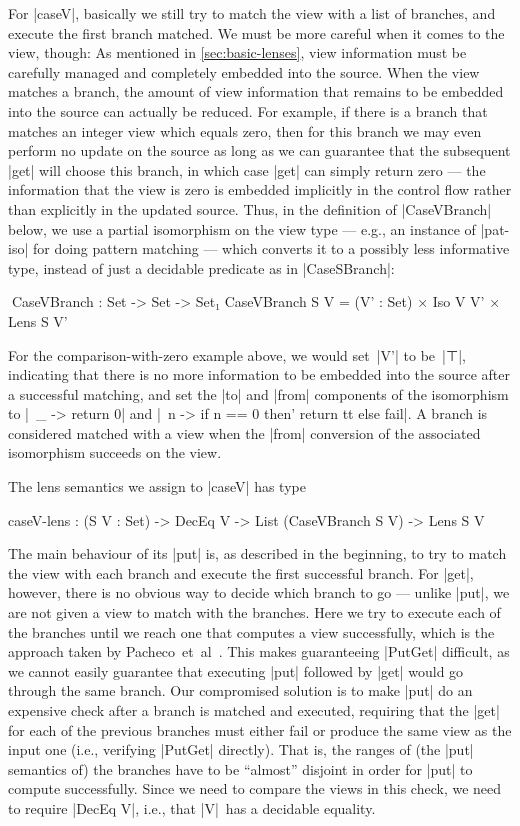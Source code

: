 \documentclass[fleqn]{llncs}
\begin{document}
For |caseV|, basically we still try to match the view with a list of branches, and execute the first branch matched.
We must be more careful when it comes to the view, though:
As mentioned in \autoref{sec:basic-lenses}, view information must be carefully managed and completely embedded into the source.
When the view matches a branch, the amount of view information that remains to be embedded into the source can actually be reduced.
For example, if there is a branch that matches an integer view which equals zero, then for this branch we may even perform no update on the source as long as we can guarantee that the subsequent |get| will choose this branch, in which case |get| can simply return zero --- the information that the view is zero is embedded implicitly in the control flow rather than explicitly in the updated source.
Thus, in the definition of |CaseVBranch| below, we use a partial isomorphism on the view type --- e.g., an instance of |pat-iso| for doing pattern matching --- which converts it to a possibly less informative type, instead of just a decidable predicate as in |CaseSBranch|:
\begin{code}
^^^CaseVBranch : Set -> Set -> Set₁
CaseVBranch S V = (V' : Set) × Iso V V' × Lens S V'
\end{code}
For the comparison-with-zero example above, we would set~|V'| to be~|⊤|, indicating that there is no more information to be embedded into the source after a successful matching, and set the |to| and |from| components of the isomorphism to |\ _ -> return 0| and |\ n -> if n == 0 then' return tt else fail|.
A branch is considered matched with a view when the |from| conversion of the associated isomorphism succeeds on the view.

The lens semantics we assign to |caseV| has type
\begin{code}
caseV-lens : (S V : Set) -> DecEq V -> List (CaseVBranch S V) -> Lens S V
\end{code}
The main behaviour of its |put| is, as described in the beginning, to try to match the view with each branch and execute the first successful branch.
For |get|, however, there is no obvious way to decide which branch to go --- unlike |put|, we are not given a view to match with the branches.
Here we try to execute each of the branches until we reach one that computes a view successfully, which is the approach taken by Pacheco~et~al~\cite{Pacheco-putlenses}.
This makes guaranteeing |PutGet| difficult, as we cannot easily guarantee that executing |put| followed by |get| would go through the same branch.
Our compromised solution is to make |put| do an expensive check after a branch is matched and executed, requiring that the |get| for each of the previous branches must either fail or produce the same view as the input one (i.e., verifying |PutGet| directly).
That is, the ranges of (the |put| semantics of) the branches have to be ``almost'' disjoint in order for |put| to compute successfully.
Since we need to compare the views in this check, we need to require |DecEq V|, i.e., that |V|~has a decidable equality.
\end{document}

